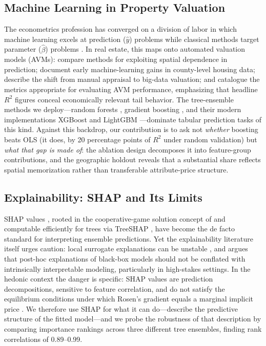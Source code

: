 \subsection{Machine Learning in Property Valuation}

The econometrics profession has converged on a division of labor in which machine
learning excels at prediction ($\hat{y}$) problems while classical methods target
parameter ($\hat{\beta}$) problems \citep{mullainathan2017machine, varian2014big,
athey2019machine}. In real estate, this maps onto automated valuation models
(AVMs): \citet{bourassa2010predicting} compare methods for exploiting spatial
dependence in prediction; \citet{park2015using} document early machine-learning
gains in county-level housing data; \citet{kok2017big} describe the shift from
manual appraisal to big-data valuation; and \citet{steurer2021metrics} catalogue
the metrics appropriate for evaluating AVM performance, emphasizing that headline
$R^2$ figures conceal economically relevant tail behavior. The tree-ensemble
methods we deploy---random forests \citep{breiman2001random}, gradient boosting
\citep{friedman2001greedy}, and their modern implementations XGBoost
\citep{chen2016xgboost} and LightGBM \citep{ke2017lightgbm}---dominate tabular
prediction tasks of this kind. Against this backdrop, our contribution is to ask
not \emph{whether} boosting beats OLS (it does, by 20 percentage points of $R^2$
under random validation) but \emph{what that gap is made of}: the ablation design
decomposes it into feature-group contributions, and the geographic holdout reveals
that a substantial share reflects spatial memorization rather than transferable
attribute-price structure.

\subsection{Explainability: SHAP and Its Limits}

SHAP values \citep{lundberg2017unified}, rooted in the cooperative-game solution
concept of \citet{shapley1953value} and computable efficiently for trees via
TreeSHAP \citep{lundberg2020local}, have become the de facto standard for
interpreting ensemble predictions. Yet the explainability literature itself urges
caution: local surrogate explanations can be unstable \citep{ribeiro2016should},
and \citet{rudin2019stop} argues that post-hoc explanations of black-box models
should not be conflated with intrinsically interpretable modeling, particularly in
high-stakes settings. In the hedonic context the danger is specific: SHAP values
are prediction decompositions, sensitive to feature correlation, and do not satisfy
the equilibrium conditions under which Rosen's gradient equals a marginal implicit
price \citep{rosen1974hedonic, bishop2020best}. We therefore use SHAP for what it
can do---describe the predictive structure of the fitted model---and we probe the
robustness of that description by comparing importance rankings across three
different tree ensembles, finding rank correlations of 0.89--0.99.

